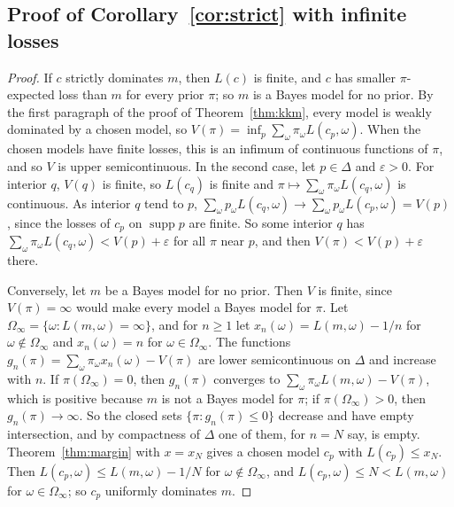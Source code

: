\documentclass[11pt]{article}
\theoremstyle{definition}
\theoremstyle{remark}
\newcommand{\supp}{\operatorname{supp}}
\begin{document}
\subsection{Proof of Corollary~\ref{cor:strict} with infinite losses}
\begin{proof}
If $c$ strictly dominates $m$, then $L(c)$ is finite, and $c$ has smaller $\pi$-expected loss than $m$ for every prior $\pi$; so $m$ is a Bayes model for no prior. By the first paragraph of the proof of Theorem~\ref{thm:kkm}, every model is weakly dominated by a chosen model, so $V(\pi)=\inf_p\sum_\omega\pi_\omega L(c_p,\omega)$. When the chosen models have finite losses, this is an infimum of continuous functions of $\pi$, and so $V$ is upper semicontinuous. In the second case, let $p\in\Delta$ and $\varepsilon>0$. For interior $q$, $V(q)$ is finite, so $L(c_q)$ is finite and $\pi\mapsto\sum_\omega\pi_\omega L(c_q,\omega)$ is continuous. As interior $q$ tend to $p$, $\sum_\omega p_\omega L(c_q,\omega)\to\sum_\omega p_\omega L(c_p,\omega)=V(p)$, since the losses of $c_p$ on $\supp p$ are finite. So some interior $q$ has $\sum_\omega\pi_\omega L(c_q,\omega)<V(p)+\varepsilon$ for all $\pi$ near $p$, and then $V(\pi)<V(p)+\varepsilon$ there.

Conversely, let $m$ be a Bayes model for no prior. Then $V$ is finite, since $V(\pi)=\infty$ would make every model a Bayes model for $\pi$. Let $\Omega_\infty=\{\omega:L(m,\omega)=\infty\}$, and for $n\ge1$ let $x_n(\omega)=L(m,\omega)-1/n$ for $\omega\notin\Omega_\infty$ and $x_n(\omega)=n$ for $\omega\in\Omega_\infty$. The functions $g_n(\pi)=\sum_\omega\pi_\omega x_n(\omega)-V(\pi)$ are lower semicontinuous on $\Delta$ and increase with $n$. If $\pi(\Omega_\infty)=0$, then $g_n(\pi)$ converges to $\sum_\omega\pi_\omega L(m,\omega)-V(\pi)$, which is positive because $m$ is not a Bayes model for $\pi$; if $\pi(\Omega_\infty)>0$, then $g_n(\pi)\to\infty$. So the closed sets $\{\pi:g_n(\pi)\le0\}$ decrease and have empty intersection, and by compactness of $\Delta$ one of them, for $n=N$ say, is empty. Theorem~\ref{thm:margin} with $x=x_N$ gives a chosen model $c_p$ with $L(c_p)\le x_N$. Then $L(c_p,\omega)\le L(m,\omega)-1/N$ for $\omega\notin\Omega_\infty$, and $L(c_p,\omega)\le N<L(m,\omega)$ for $\omega\in\Omega_\infty$; so $c_p$ uniformly dominates $m$.
\end{proof}
\end{document}

